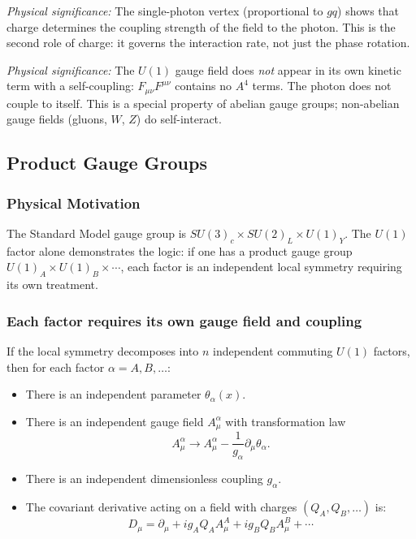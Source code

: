 \documentclass[../main.tex]{subfiles}
\begin{document}
\textit{Physical significance:} The single-photon vertex (proportional to $gq$) shows that charge determines the coupling strength of the field to the photon.  This is the second role of charge: it governs the interaction rate, not just the phase rotation.

\textit{Physical significance:} The $U(1)$ gauge field does \emph{not} appear in its own kinetic term with a self-coupling: $F_{\mu\nu}F^{\mu\nu}$ contains no $A^4$ terms.  The photon does not couple to itself.  This is a special property of abelian gauge groups; non-abelian gauge fields (gluons, $W$, $Z$) do self-interact.

\subsection*{Product Gauge Groups}

\subsubsection*{Physical Motivation}

The Standard Model gauge group is $SU(3)_c\times SU(2)_L\times U(1)_Y$.  The $U(1)$ factor alone demonstrates the logic: if one has a product gauge group $U(1)_A\times U(1)_B\times\cdots$, each factor is an independent local symmetry requiring its own treatment.

\subsubsection*{Each factor requires its own gauge field and coupling}

If the local symmetry decomposes into $n$ independent commuting $U(1)$ factors, then for each factor $\alpha=A,B,\ldots$:
\begin{itemize}
  \item There is an independent parameter $\theta_\alpha(x)$.
  \item There is an independent gauge field $A_\mu^\alpha$ with transformation law
    \[A_\mu^\alpha\to A_\mu^\alpha - \frac{1}{g_\alpha}\partial_\mu\theta_\alpha.\]
  \item There is an independent dimensionless coupling $g_\alpha$.
  \item The covariant derivative acting on a field with charges $(Q_A, Q_B,\ldots)$ is:
    \[D_\mu = \partial_\mu + ig_A Q_A A_\mu^A + ig_B Q_B A_\mu^B + \cdots\]
\end{itemize}
\end{document}
